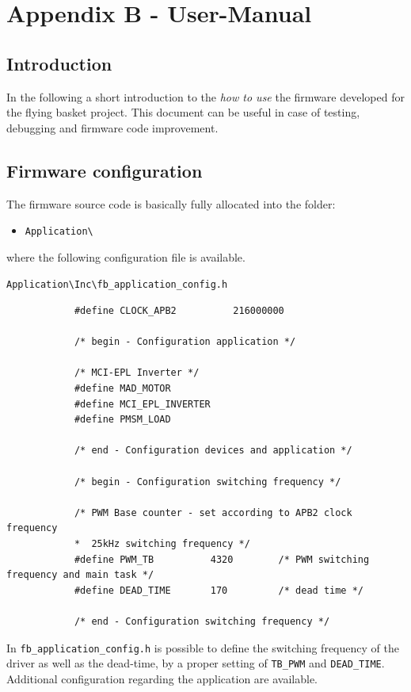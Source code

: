 \documentclass[11pt,a4paper,oneside]{book}
\numberwithin{equation}{section}
\theoremstyle{it}
\theoremstyle{definition}
\begin{document}
\chapter{Appendix B - User-Manual}
\section{Introduction}	
In the following a short introduction to the \textit{how to use} the firmware developed for the flying basket project. This document can be useful in case of testing, debugging and firmware code improvement.

\section{Firmware configuration}	
The firmware source code is basically fully allocated into the folder:
\begin{itemize}
	\item[--] {\selectfont \verb+Application\+}
\end{itemize}	
where the following configuration file is available. 
\begin{mybox}
		{\selectfont \verb+Application\Inc\fb_application_config.h+}
	{\selectfont \footnotesize \noindent
		\begin{verbatim}
			#define CLOCK_APB2 			216000000
			
			/* begin - Configuration application */
			
			/* MCI-EPL Inverter */
			#define MAD_MOTOR
			#define MCI_EPL_INVERTER
			#define PMSM_LOAD
			
			/* end - Configuration devices and application */
			
			/* begin - Configuration switching frequency */
			
			/* PWM Base counter - set according to APB2 clock frequency
			*  25kHz switching frequency */
			#define PWM_TB 			4320 		/* PWM switching frequency and main task */
			#define DEAD_TIME 		170 		/* dead time */
			
			/* end - Configuration switching frequency */
	\end{verbatim}}
\end{mybox}

In {\selectfont \verb+fb_application_config.h+} is possible to define the switching frequency of the driver as well as the dead-time, by a proper setting of \texttt{TB\_PWM} and \texttt{DEAD\_TIME}. Additional configuration regarding the application are available.
\end{document}
